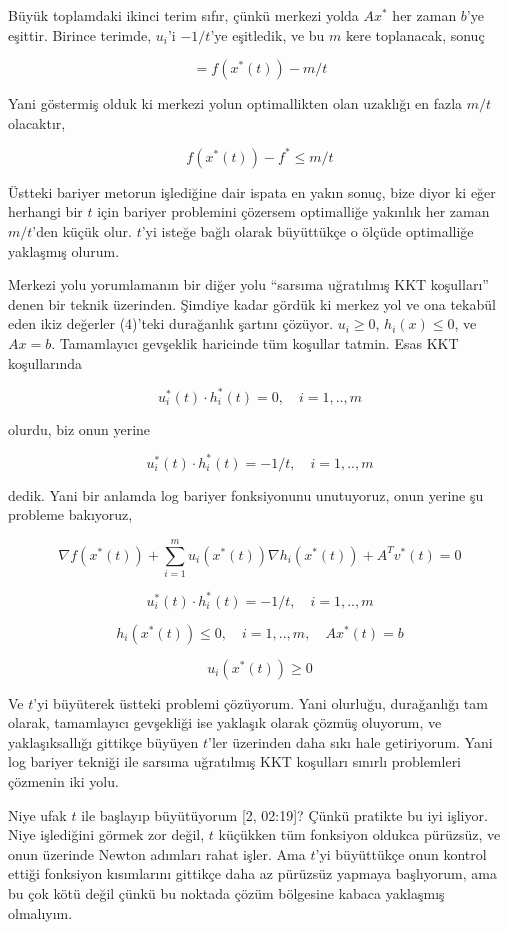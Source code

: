 \documentclass[12pt,fleqn]{article}\usepackage{../../common}
\begin{document}
Büyük toplamdaki ikinci terim sıfır, çünkü merkezi yolda $Ax^*$ her zaman
$b$'ye eşittir. Birince terimde, $u_i$'i $-1/t$'ye eşitledik, ve bu $m$
kere toplanacak, sonuç

$$
= f(x^*(t)) - m/t
$$

Yani göstermiş olduk ki merkezi yolun optimallikten olan uzaklığı en fazla
$m/t$ olacaktır,

$$
f(x^*(t)) - f^* \le m/t
$$

Üstteki bariyer metorun işlediğine dair ispata en yakın sonuç, bize diyor
ki eğer herhangi bir $t$ için bariyer problemini çözersem optimalliğe
yakınlık her zaman $m/t$'den küçük olur. $t$'yi isteğe bağlı olarak
büyüttükçe o ölçüde optimalliğe yaklaşmış olurum. 

Merkezi yolu yorumlamanın bir diğer yolu ``sarsıma uğratılmış KKT
koşulları'' denen bir teknik üzerinden. Şimdiye kadar gördük ki merkez yol
ve ona tekabül eden ikiz değerler (4)'teki durağanlık şartını çözüyor. 
$u_i \ge 0$, $h_i(x) \le 0$, ve $Ax = b$. Tamamlayıcı gevşeklik haricinde tüm
koşullar tatmin. Esas KKT koşullarında 

$$
u_i^*(t) \cdot h_i^*(t) = 0, \quad i=1,..,m
$$

olurdu, biz onun yerine 

$$
u_i^*(t) \cdot h_i^*(t) = -1/t, \quad i=1,..,m
$$

dedik. Yani bir anlamda log bariyer fonksiyonunu unutuyoruz, onun yerine şu
probleme bakıyoruz,

$$
\nabla f(x^*(t)) + \sum_{i=1}^{m} u_i(x^*(t))\nabla h_i(x^*(t)) + A^T v^*(t) = 0
$$

$$
u_i^*(t) \cdot h_i^*(t) = -1/t, \quad i=1,..,m
$$

$$
h_i(x^*(t)) \le 0, \quad i=1,..,m, \quad Ax^*(t) = b
$$

$$
u_i(x^*(t)) \ge 0
$$

Ve $t$'yi büyüterek üstteki problemi çözüyorum. Yani olurluğu, durağanlığı
tam olarak, tamamlayıcı gevşekliği ise yaklaşık olarak çözmüş oluyorum, ve
yaklaşıksallığı gittikçe büyüyen $t$'ler üzerinden daha sıkı hale getiriyorum. 
Yani log bariyer tekniği ile sarsıma uğratılmış KKT koşulları sınırlı
problemleri çözmenin iki yolu. 

Niye ufak $t$ ile başlayıp büyütüyorum [2, 02:19]? Çünkü pratikte bu iyi
işliyor. Niye işlediğini görmek zor değil, $t$ küçükken tüm fonksiyon
oldukca pürüzsüz, ve onun üzerinde Newton adımları rahat işler. Ama $t$'yi
büyüttükçe onun kontrol ettiği fonksiyon kısımlarını gittikçe daha az
pürüzsüz yapmaya başlıyorum, ama bu çok kötü değil çünkü bu noktada çözüm
bölgesine kabaca yaklaşmış olmalıyım. 
\end{document}
